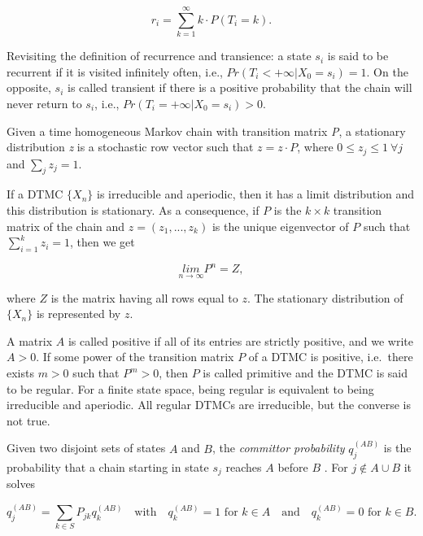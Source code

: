 \documentclass[
  nojss]{jss}
\begin{document}
\[
 r_i = \sum_{k = 1}^{\infty} k \cdot P(T_i = k).
\]

Revisiting the definition of recurrence and transience: a state \(s_{i}\) is said to be recurrent if it is visited infinitely often, i.e., \(Pr(T_{i}<+\infty|X_{0}=s_{i})=1\). On the opposite, \(s_{i}\) is called transient if there is a positive probability that the chain will never return to \(s_{i}\), i.e., \(Pr(T_{i}=+\infty|X_{0}=s_{i})>0\).

Given a time homogeneous Markov chain with transition matrix \emph{P}, a stationary distribution \emph{z} is a stochastic row vector such that \(z=z\cdot P\), where \(0\leq z_{j}\leq 1 \: \forall j\) and \(\sum_{j}z_{j}=1\).

If a DTMC \(\{X_{n}\}\) is irreducible and aperiodic, then it has a limit distribution and this distribution is stationary. As a consequence, if \(P\) is the \(k\times k\) transition matrix of the chain and \(z=\left(z_{1},...,z_{k}\right)\) is the unique eigenvector of \(P\) such that \(\sum_{i=1}^{k}z_{i}=1\), then we get

\begin{equation}
  \underset{n\rightarrow\infty}{lim}P^{n}=Z,
  \label{eq:limMc}
\end{equation}

where \(Z\) is the matrix having all rows equal to \(z\). The stationary distribution of \(\{X_{n}\}\) is represented by \(z\).

A matrix \(A\) is called positive if all of its entries are strictly positive, and we write \(A > 0\). If some power of the transition matrix \(P\) of a DTMC is positive, i.e.~there exists \(m > 0\) such that \(P^m > 0\), then \(P\) is called primitive and the DTMC is said to be regular. For a finite state space, being regular is equivalent to being irreducible and aperiodic. All regular DTMCs are irreducible, but the converse is not true.

Given two disjoint sets of states \(A\) and \(B\), the \emph{committor probability} \(q_j^{(AB)}\) is the probability that a chain starting in state \(s_j\) reaches \(A\) before \(B\) \citep{noe_constructing_2009}. For \(j \notin A \cup B\) it solves

\begin{equation}
 q_j^{(AB)} = \sum_{k \in S} P_{jk}q_k^{(AB)} \quad \mbox{with} \quad
 q_k^{(AB)} = 1 \mbox{ for } k \in A \quad \mbox{and} \quad  q_k^{(AB)} = 0 \mbox{ for } k \in B.
\end{equation}
\end{document}
